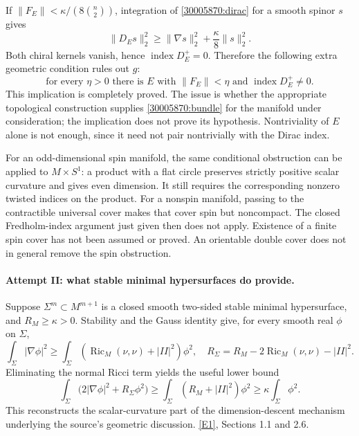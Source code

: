 \documentclass[11pt,a4paper]{article}
\newcommand{\eref}[2]{\hyperlink{extra:#1:#2}{[E#2]}}
\numberwithin{equation}{section}
\begin{document}
If $\|F_E\|<\kappa/(8\binom n2)$, integration of
\eqref{30005870:dirac} for a smooth spinor $s$ gives
\[
 \|D_Es\|_2^2\geq\|\nabla s\|_2^2+\frac\kappa8\|s\|_2^2.
\]
Both chiral kernels vanish, hence $\operatorname{index}D_E^+=0$.
Therefore the following extra geometric condition rules out $g$:
\begin{equation}\label{30005870:bundle}
 \text{for every $\eta>0$ there is $E$ with }
 \|F_E\|<\eta\text{ and }\operatorname{index}D_E^+\ne0.
\end{equation}
This implication is completely proved.  The issue is whether the
appropriate topological construction supplies \eqref{30005870:bundle} for
the manifold under consideration; the implication does not prove its
hypothesis.  Nontriviality of $E$ alone is not enough, since it need not
pair nontrivially with the Dirac index.

For an odd-dimensional spin manifold, the same conditional obstruction
can be applied to $M\times S^1$: a product with a flat circle preserves
strictly positive scalar curvature and gives even dimension.  It still
requires the corresponding nonzero twisted indices on the product.
For a nonspin manifold, passing to the contractible universal cover
makes that cover spin but noncompact.  The closed Fredholm-index
argument just given then does not apply.  Existence of a finite spin
cover has not been assumed or proved.  An orientable double cover does
not in general remove the spin obstruction.

\paragraph{Attempt II: what stable minimal hypersurfaces do provide.}
Suppose $\Sigma^m\subset M^{m+1}$ is a closed smooth two-sided stable
minimal hypersurface, and $R_M\geq\kappa>0$.  Stability and the Gauss
identity give, for every smooth real $\phi$ on $\Sigma$,
\[
 \int_\Sigma|\nabla\phi|^2\geq
 \int_\Sigma(\operatorname{Ric}_M(\nu,\nu)+|II|^2)\phi^2,
 \quad
 R_\Sigma=R_M-2\operatorname{Ric}_M(\nu,\nu)-|II|^2.
\]
Eliminating the normal Ricci term yields the useful lower bound
\begin{equation}\label{30005870:stable}
 \int_\Sigma\bigl(2|\nabla\phi|^2+R_\Sigma\phi^2\bigr)
 \geq\int_\Sigma(R_M+|II|^2)\phi^2
 \geq\kappa\int_\Sigma\phi^2.
\end{equation}
This reconstructs the scalar-curvature part of the dimension-descent
mechanism underlying the source's geometric discussion.
\eref{30005870}{1}, Sections 1.1 and 2.6.
\end{document}
